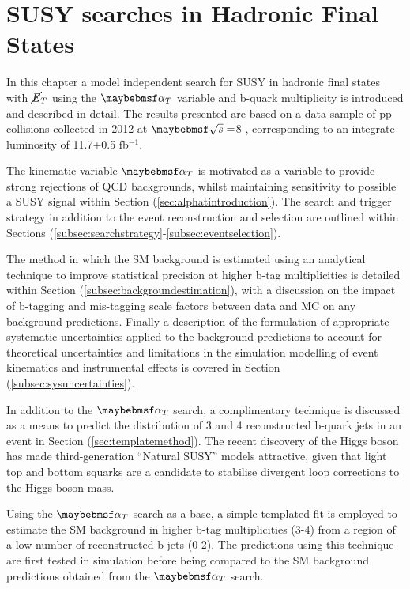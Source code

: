 \chapter{SUSY searches in Hadronic Final States}
\label{chap:SUSYsearches}

In this chapter a model independent search for \ac{SUSY} in hadronic final states with $\cancel{E}_{T}$ using the $\alphat$ variable and b-quark multiplicity is introduced and described in detail. The results presented are based on a data sample of pp collisions collected in 2012 at $\com =$8 \TeV, corresponding to an integrate luminosity of 11.7$\pm$0.5 fb$^{-1}$.

The kinematic variable $\alphat$ is motivated as a variable to provide strong rejections of QCD backgrounds, whilst maintaining sensitivity to possible a \ac{SUSY} signal within Section (\ref{sec:alphatintroduction}). The search and trigger strategy in addition to the event reconstruction and selection are outlined within Sections (\ref{subsec:searchstrategy}-\ref{subsec:eventselection}). 

The method in which the \ac{SM} background is estimated using an analytical technique to improve statistical precision at higher b-tag multiplicities is detailed within Section (\ref{subsec:backgroundestimation}), with a discussion on the impact of b-tagging and mis-tagging scale factors between data and MC on any background predictions. Finally a description of the formulation of appropriate systematic uncertainties applied to the background predictions to account for theoretical uncertainties and limitations in the simulation modelling of event kinematics and instrumental effects is covered in Section (\ref{subsec:sysuncertainties}).


In addition to the $\alphat$ search, a complimentary technique is discussed as a means to predict the distribution of 3 and 4 reconstructed b-quark jets in an event in Section (\ref{sec:templatemethod}). The recent discovery of the Higgs boson has made third-generation ``Natural \ac{SUSY}'' models attractive, given that light top and bottom squarks are a candidate to stabilise divergent loop corrections to the Higgs boson mass.

Using the $\alphat$ search as a base, a simple templated fit is employed to estimate the \ac{SM} background in higher b-tag multiplicities (3-4) from a region of a low number of reconstructed b-jets (0-2). The predictions using this technique are first tested in simulation before being compared to the \ac{SM} background predictions obtained from the $\alphat$ search.  

